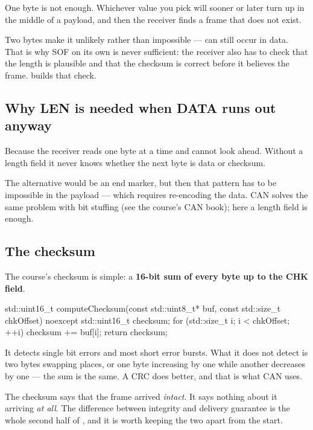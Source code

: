 One byte is not enough. Whichever value you pick will sooner or later turn up in the middle of a
payload, and then the receiver finds a frame that does not exist.

Two bytes make it unlikely rather than impossible ---  can still occur in data. That
is why SOF on its own is never sufficient: the receiver also has to check that the length is
plausible and that the checksum is correct before it believes the frame. 
builds that check.

\subsection{Why LEN is needed when DATA runs out anyway}

Because the receiver reads one byte at a time and cannot look ahead. Without a length field it
never knows whether the next byte is data or checksum.

The alternative would be an end marker, but then that pattern has to be impossible in the payload
--- which requires re-encoding the data. CAN solves the same problem with bit stuffing (see the
course's CAN book); here a length field is enough.

\subsection{The checksum}

The course's checksum is simple: a \textbf{16-bit sum of every byte up to the CHK field}.

\begin{cppcode}
std::uint16_t computeChecksum(const std::uint8_t* buf, const std::size_t chkOffset) noexcept
{
    std::uint16_t checksum{};
    for (std::size_t i{}; i < chkOffset; ++i)
    {
        checksum += buf[i];
    }
    return checksum;
}
\end{cppcode}

It detects single bit errors and most short error bursts. What it does not detect is two bytes
swapping places, or one byte increasing by one while another decreases by one --- the sum is the
same. A CRC does better, and that is what CAN uses.

\begin{aside}
\note The checksum says that the frame arrived \emph{intact}. It says nothing about it arriving
\emph{at all}. The difference between integrity and delivery guarantee is the whole second half of
, and it is worth keeping the two apart from the start.
\end{aside}

